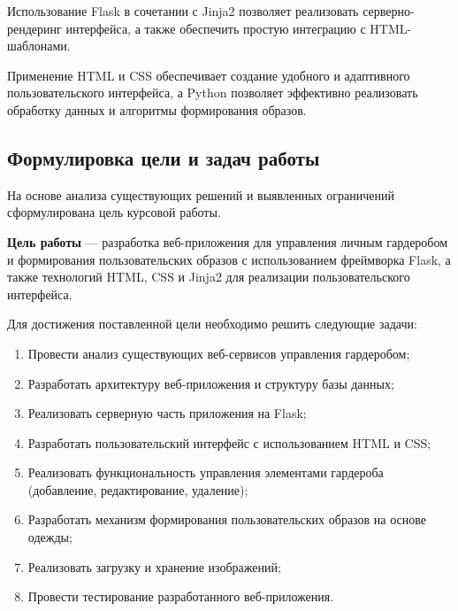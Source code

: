 Использование Flask в сочетании с Jinja2 позволяет реализовать серверно-рендеринг интерфейса, а также обеспечить простую интеграцию с HTML-шаблонами.

Применение HTML и CSS обеспечивает создание удобного и адаптивного пользовательского интерфейса, а Python позволяет эффективно реализовать обработку данных и алгоритмы формирования образов.

\subsection{Формулировка цели и задач работы}

На основе анализа существующих решений и выявленных ограничений сформулирована цель курсовой работы.

\textbf{Цель работы} --- разработка веб-приложения для управления личным гардеробом и формирования пользовательских образов с использованием фреймворка Flask, а также технологий HTML, CSS и Jinja2 для реализации пользовательского интерфейса.

Для достижения поставленной цели необходимо решить следующие задачи:

\begin{enumerate}
	\item Провести анализ существующих веб-сервисов управления гардеробом;
	\item Разработать архитектуру веб-приложения и структуру базы данных;
	\item Реализовать серверную часть приложения на Flask;
	\item Разработать пользовательский интерфейс с использованием HTML и CSS;
	\item Реализовать функциональность управления элементами гардероба (добавление, редактирование, удаление);
	\item Разработать механизм формирования пользовательских образов на основе одежды;
	\item Реализовать загрузку и хранение изображений;
	\item Провести тестирование разработанного веб-приложения.
\end{enumerate}